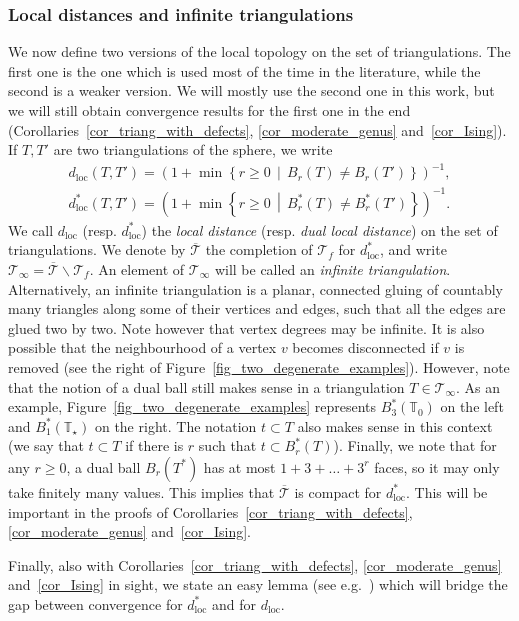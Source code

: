 \documentclass[AHL,Unicode,longabstracts,published]{cedram}
\newcommand{\loc}{\mathrm{loc}}
\newcommand{\T}{\mathcal{T}}
\newcommand{\TT}{\mathbb{T}}
\begin{document}
\subsubsection*{Local distances and infinite triangulations}
We now define two versions of the local topology on the set of triangulations. The first one is the one which is used most of the time in the literature, while the second is a weaker version. We will mostly use the second one in this work, but we will still obtain convergence results for the first one in the end (Corollaries~\ref{cor_triang_with_defects}, \ref{cor_moderate_genus} and~\ref{cor_Ising}). If $T,T'$ are two triangulations of the sphere, we write
\begin{align*}
d_{\loc}(T,T') = \left(1+\min \left\{ r \geq 0 \,\middle|\, B_r(T) \ne B_r(T') \right\}\right)^{-1},
\\
d_{\loc}^*(T,T') = \left(1+\min \left\{ r \geq 0 \,\middle|\, B_r^*(T) \ne B_r^*(T') \right\}\right)^{-1}.
\end{align*}
We call $d_{\loc}$ (resp. $d^*_{\loc}$) the \emph{local distance} (resp. \emph{dual local distance}) on the set of triangulations. We denote by $\overline{\T}$ the completion of $\T_f$ for $d^*_{\loc}$, and write $\T_{\infty} = \overline{\T} \backslash \T_f$. An element of $\T_{\infty}$ will be called an \emph{infinite triangulation}. Alternatively, an infinite triangulation is a planar, connected gluing of countably many triangles along some of their vertices and edges, such that all the edges are glued two by two. Note however that vertex degrees may be infinite. It is also possible that the neighbourhood of a vertex $v$ becomes disconnected if $v$ is removed (see the right of Figure~\ref{fig_two_degenerate_examples}). However, note that the notion of a dual ball still makes sense in a triangulation $T \in \T_{\infty}$. As an example, Figure~\ref{fig_two_degenerate_examples} represents $B^*_3(\TT_0)$ on the left and $B_1^*(\TT_{\star})$ on the right. The notation $t \subset T$ also makes sense in this context (we say that $t \subset T$ if there is $r$ such that $t \subset B_r^*(T)$). Finally, we note that for any $r \geq 0$, a dual ball $B_r(T^*)$ has at most $1+3+\dots+3^r$ faces, so it may only take finitely many values. This implies that $\overline{\T}$ is compact for $d_{\loc}^*$. This will be important in the proofs of Corollaries~\ref{cor_triang_with_defects}, \ref{cor_moderate_genus} and~\ref{cor_Ising}.

Finally, also with Corollaries~\ref{cor_triang_with_defects}, \ref{cor_moderate_genus} and~\ref{cor_Ising} in sight, we state an easy lemma (see e.g.~\cite[Lemma~3]{BL19}) which will bridge the gap between convergence for $d^*_{\loc}$ and for $d_{\loc}$.
\end{document}
